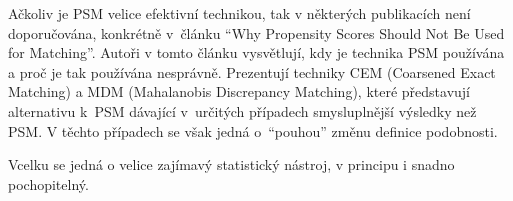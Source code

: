 Ačkoliv je PSM velice efektivní technikou, tak v některých publikacích není doporučována, konkrétně v~článku \enquote{Why Propensity Scores Should Not Be Used for Matching}.
Autoři v tomto článku vysvětlují, kdy je technika PSM používána a proč je tak používána nesprávně.
Prezentují techniky CEM (Coarsened Exact Matching) a MDM (Mahalanobis Discrepancy Matching), které představují alternativu k~PSM dávající v~určitých případech smysluplnější výsledky než PSM.
V těchto případech se však jedná o~\enquote{pouhou} změnu definice podobnosti.

Vcelku se jedná o velice zajímavý statistický nástroj, v principu i snadno pochopitelný.
